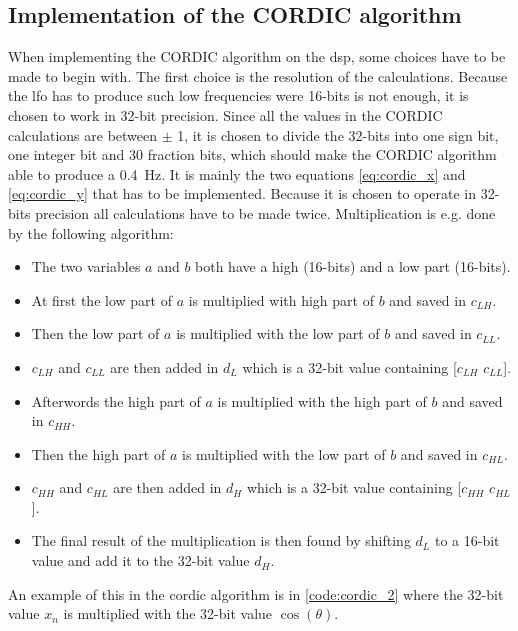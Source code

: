 \subsection{Implementation of the CORDIC algorithm}
When implementing the CORDIC algorithm on the \gls{dsp}, some choices have to be made to begin with. The first choice is the resolution of the calculations. Because the \gls{lfo} has to produce such low frequencies were 16-bits is not enough, it is chosen to work in 32-bit precision. Since all the values in the CORDIC calculations are between $\pm$ 1, it is chosen to divide the 32-bits into one sign bit, one integer bit and 30 fraction bits, which should make the CORDIC algorithm able to produce a \SI{0.4}{\hertz}.
It is mainly the two equations \autoref{eq:cordic_x} and \autoref{eq:cordic_y} that has to be implemented. Because it is chosen to operate in 32-bits precision all calculations have to be made twice. Multiplication is e.g. done by the following algorithm:
\begin{itemize}
\item The two variables $a$ and $b$ both have a high (16-bits) and a low part (16-bits).
\item At first the low part of $a$ is multiplied with high part of $b$ and saved in $c_{LH}$.
\item Then the low part of $a$ is multiplied with the low part of $b$ and saved in $c_{LL}$.
\item $c_{LH}$ and $c_{LL}$ are then added in $d_L$ which is a 32-bit value containing [$c_{LH}$ $c_{LL}$].
\item Afterwords the high part of $a$ is multiplied with the high part of $b$ and saved in $c_{HH}$.
\item Then the high part of $a$ is multiplied with the low part of $b$ and saved in $c_{HL}$.
\item $c_{HH}$ and $c_{HL}$ are then added in $d_H$ which is a 32-bit value containing [$c_{HH}$ $c_{HL}$].
\item The final result of the multiplication is then found by shifting $d_L$ to a 16-bit value and add it to the 32-bit value $d_H$.
\end{itemize}

An example of this in the \gls{cordic} algorithm is in \autoref{code:cordic_2} where the 32-bit value $x_n$ is multiplied with the 32-bit value $\cos(\theta)$.

